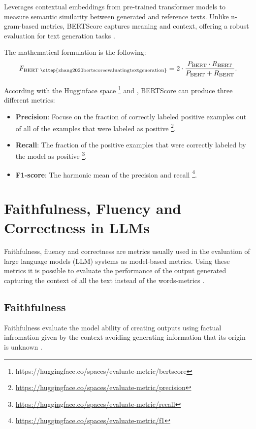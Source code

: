 Leverages contextual embeddings from pre-trained transformer models to measure semantic similarity between generated and reference texts. Unlike n-gram-based metrics, BERTScore captures meaning and context, offering a robust evaluation for text generation tasks \cite{zhang2020bertscoreevaluatingtextgeneration}.

The mathematical formulation is the following:
\[
F_{\text{BERT \citep{zhang2020bertscoreevaluatingtextgeneration}}} = 2 \cdot \frac{P_{\text{BERT}} \cdot R_{\text{BERT}}}{P_{\text{BERT}} + R_{\text{BERT}}}.
\]

According with the Hugginface space \footnote{https://huggingface.co/spaces/evaluate-metric/bertscore} and \citep{zhang2020bertscoreevaluatingtextgeneration}, BERTScore can produce three different metrics:
\begin{itemize}
    \item \textbf{Precision}: Focuse on the fraction of correctly labeled positive examples out of all of the examples that were labeled as positive \footnote{\url{https://huggingface.co/spaces/evaluate-metric/precision}}.
    \item \textbf{Recall}: The fraction of the positive examples that were correctly labeled by the model as positive \footnote{\url{https://huggingface.co/spaces/evaluate-metric/recall}}.
    \item \textbf{F1-score}: The harmonic mean of the precision and recall \footnote{\url{https://huggingface.co/spaces/evaluate-metric/f1}}.
\end{itemize}

\section{Faithfulness, Fluency and Correctness in LLMs}

Faithfulness, fluency and correctness are metrics usually used in the evaluation of large language models (LLM) systems as model-based metrics. Using these metrics it is possible to evaluate the performance of the output generated capturing the context of all the text instead of the words-metrics \citep{lyu2024faithfulmodelexplanationnlp}.


\subsection{Faithfulness}
Faithfulness evaluate the model ability of creating outputs using factual infromation given by the context avoiding generating information that its origin is unknown  \citep{jacovi-goldberg-2020-towards}.

